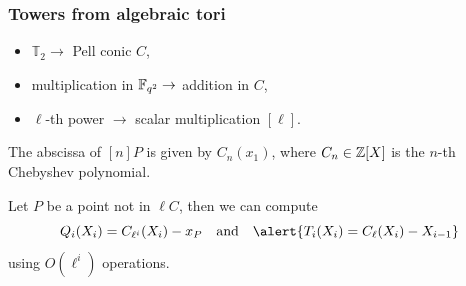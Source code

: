 \documentclass[12pt]{beamer}
\begin{document}

\begin{frame}
  \frametitle{Towers from algebraic tori}

  \begin{itemize}
  \item $\mathbb{T}_2 \to$ Pell conic $C$,
  \item multiplication in $\mathbb{F}_{q^2} \to$ addition in $C$,
  \item $\ell$-th power $\to$ scalar multiplication $[\ell]$.
  \end{itemize}
  
  \begin{lemma}
    The abscissa of $[n]P$ is given by $C_n(x_1)$, where
    $C_n\in\mathbb{Z}[X]$ is the $n$-th \alert{Chebyshev
      polynomial}.
  \end{lemma}
  
  \begin{theorem}
    Let $P$ be a point not in $\ell C$, then we can compute
    \begin{equation*}
      Q_i(X_i) = C_{\ell^i}(X_i) - x_P
      \quad\text{and}\quad
      \alert{T_i(X_i) = C_{\ell}(X_i) - X_{i-1}}
    \end{equation*}
    using $O(\ell^i)$ operations.
  \end{theorem}
\end{frame}

\end{document}
